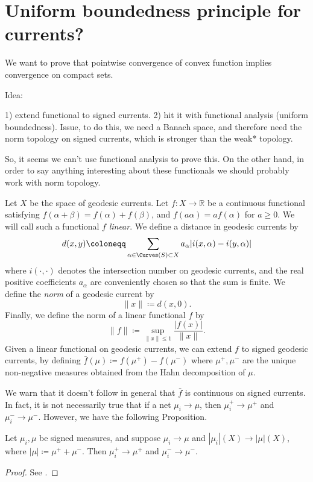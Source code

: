 \section{Uniform boundedness principle for currents?}

We want to prove that pointwise convergence of convex function implies convergence on compact sets.

Idea: 

1) extend functional to signed currents.
2) hit it with functional analysis (uniform boundedness). Issue, to do this, we need a Banach space, and therefore need the norm topology on signed currents, which is stronger than the weak* topology.

So, it seems we can't use functional analysis to prove this.
On the other hand, in order to say anything interesting about these functionals we should probably work with norm topology.




Let $X$ be the space of geodesic currents. Let $f \colon X \to \mathbb{R}$ be a continuous functional satisfying $f(\alpha + \beta) = f(\alpha) + f(\beta)$, and $f(a \alpha) = a f(\alpha)$ for $a \geq 0$.
We will call such a functional $f$ \emph{linear}.
We define a distance in geodesic currents by
\[
d(x,y) \coloneqq \sum_{\alpha \in \Curves(S) \subset X} a_{\alpha} |i(x,\alpha)-i(y,\alpha)|
\]
where $i(\cdot,\cdot)$ denotes the intersection number on geodesic currents, and the real positive coefficients $a_{\alpha}$ are conveniently chosen so that the sum is finite.
We define the \emph{norm} of a geodesic current by
\[
\|x\| \coloneqq d(x,0).
\]
Finally, we define the norm of a linear functional $f$ by
\[
\| f \| \coloneqq \sup_{\| x \| \leq 1} \frac{|f(x)|}{\|x \|}.
\]
Given a linear functional on geodesic currents, we can extend $f$ to signed geodesic currents, by defining $\bar{f}(\mu) \coloneqq f(\mu^+) - f(\mu^-)$ where $\mu^+,\mu^-$ are the unique non-negative measures obtained from the Hahn decomposition of $\mu$. 

\begin{remark}We warn that it doesn't follow in general that $\bar{f}$ is continuous on signed currents. In fact, it is not necessarily true that if a net $\mu_i \to \mu$, then $\mu^+_i \to \mu^+$ and $\mu^-_i \to \mu^-$.
However, we have the following Proposition.
\end{remark}

\begin{proposition}
Let $\mu_i,\mu$ be signed measures, and suppose $\mu_i \to \mu$ and $|\mu_i|(X) \to |\mu|(X)$, where $|\mu|\coloneqq \mu^+ + \mu^-$.
Then $\mu^+_i \to \mu^+$ and $\mu^-_i \to \mu^-$.
\end{proposition}
\begin{proof}
See \cite[Corollary~8.4.8]{Bo07:MeasureTheory}.
\end{proof}

